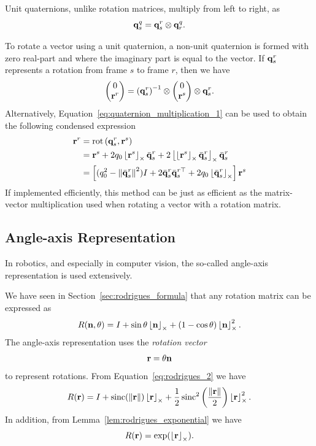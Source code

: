 Unit quaternions, unlike rotation matrices, multiply from left to
right, as 
\[
\mathbf{q}_{s}^{q}=\mathbf{q}_{s}^{r}\otimes\mathbf{q}_{r}^{q}.
\]

To rotate a vector using a unit quaternion, a non-unit quaternion is formed with zero real-part and where the imaginary part is equal to the vector.  If $\mathbf{q}_s^r$ represents a rotation from frame $s$ to frame $r$, then we have 
\begin{equation}
\begin{pmatrix} 0 \\ \rbf^{r}\end{pmatrix}=\left(\qbf_{s}^{r}\right)^{-1}\otimes\begin{pmatrix}0\\
\rbf^{s}
\end{pmatrix}\otimes\qbf_{s}^{r}.\label{eq:quat_rotation}
\end{equation}
Alternatively, Equation~\eqref{eq:quaternion_multiplication_1} can be used to obtain the following condensed expression
\begin{align*}
\mathbf{r}^{r} & =\text{rot} \left(\mathbf{q}_{s}^{r},\mathbf{r}^{s}\right)\\
 &=\mathbf{r}^s + 2q_0\left\lfloor\mathbf{r}^s\right\rfloor_{\times}\bar{\mathbf{q}}_s^r+2\left\lfloor\left\lfloor\mathbf{r}^s\right\rfloor_{\times}\bar{\mathbf{q}}_s^r\right\rfloor_{\times}\bar{\mathbf{q}}_s^r\\
 &= \left[ (q_0^2-\left\|\bar{\mathbf{q}}_s^r\right\|^2)I + 2 \bar{\mathbf{q}}_s^r \bar{\mathbf{q}}_s^{r\top} + 2 q_0 \left\lfloor\bar{\mathbf{q}}_s^r\right\rfloor_{\times}\right] \mathbf{r}^s  
\end{align*}
If implemented efficiently, this method can be just as efficient as
the matrix-vector multiplication used when rotating a vector with
a rotation matrix.


\subsection{Angle-axis Representation}
In robotics, and especially in computer vision, the so-called angle-axis representation is used extensively.  

We have seen in Section~\ref{sec:rodrigues_formula} that any rotation matrix can be expressed as
\[
R(\mathbf{n},\theta) = I + \sin\theta\left\lfloor\mathbf{n}\right\rfloor_{\times} + (1-\cos\theta)\left\lfloor\mathbf{n}\right\rfloor_{\times}^2.  
\]
The angle-axis representation uses the {\em rotation vector}
\[
\mathbf{r} = \theta\mathbf{n}
\]
to represent rotations.  From Equation~\eqref{eq:rodrigues_2} we have
\begin{align}
R(\mathbf{r}) = I + \operatorname{sinc}(\left\|\mathbf{r}\right\|)\left\lfloor\mathbf{r}\right\rfloor_{\times} + \frac{1}{2}\operatorname{sinc}^2\left(\frac{\left\|\mathbf{r}\right\|}{2}\right)\left\lfloor\mathbf{r}\right\rfloor_{\times}^2.
\end{align}
In addition, from Lemma~\ref{lem:rodrigues_exponential} we have
\[
R(\mathbf{r}) = \exp(\left\lfloor\mathbf{r}\right\rfloor_{\times}).
\]

